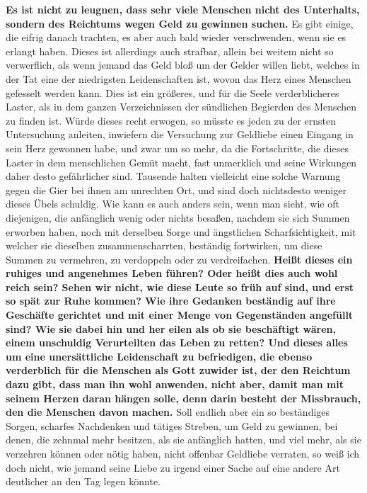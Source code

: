 \medskip

\textbf{Es ist nicht zu leugnen, dass sehr viele Menschen nicht des Unterhalts,
sondern
des Reichtums wegen Geld zu gewinnen suchen.} Es gibt einige, die eifrig
danach trachten, es aber auch bald wieder verschwenden,
wenn sie es erlangt
haben. Dieses ist allerdings auch strafbar, allein bei weitem nicht so
verwerflich, als wenn jemand das Geld bloß um der Gelder willen liebt, welches
in der Tat eine der niedrigsten Leidenschaften
ist, wovon das Herz eines
Menschen gefesselt werden kann. Dies ist ein größeres, und für die Seele
verderblicheres Laster, als in dem ganzen Verzeichnissen der sündlichen
Begierden des Menschen zu finden ist. Würde dieses recht erwogen, so müsste es
jeden zu der ernsten Untersuchung anleiten, inwiefern die Versuchung zur
Geldliebe einen Eingang in sein Herz gewonnen habe, und zwar um so mehr, da die
Fortschritte, die dieses Laster in dem menschlichen Gemüt macht, fast
unmerklich und seine Wirkungen daher desto gefährlicher sind. Tausende halten
vielleicht eine solche Warnung gegen die Gier bei ihnen am unrechten Ort, und
sind doch nichtsdesto weniger dieses Übels schuldig. Wie kann es auch anders
sein, wenn man sieht, wie oft diejenigen, die anfänglich wenig oder nichts
besaßen, nachdem sie sich Summen erworben haben, noch mit derselben Sorge und
ängstlichen Scharfsichtigkeit, mit welcher sie dieselben zusammenscharrten,
beständig fortwirken, um diese Summen zu vermehren, zu verdoppeln oder zu
verdreifachen. \textbf{Heißt dieses ein ruhiges und angenehmes Leben führen?
Oder heißt
dies auch wohl reich sein? Sehen wir nicht, wie diese Leute so früh auf sind,
und erst so spät zur Ruhe kommen? Wie ihre Gedanken beständig auf ihre Geschäfte
gerichtet und mit einer Menge von Gegenständen angefüllt sind? Wie sie dabei hin
und her eilen als ob sie beschäftigt wären, einem unschuldig Verurteilten das
Leben zu retten? Und dieses alles um eine unersättliche Leidenschaft zu
befriedigen, die ebenso verderblich für die Menschen als Gott zuwider ist, der
den Reichtum dazu gibt, dass man ihn wohl anwenden, nicht aber, damit man mit
seinem Herzen daran hängen solle, denn darin besteht der Missbrauch, den die
Menschen davon machen.} Soll endlich aber ein so beständiges Sorgen, scharfes
Nachdenken und tätiges Streben, um Geld zu gewinnen, bei denen, die zehnmal
mehr besitzen, als sie anfänglich hatten, und viel mehr, als sie verzehren
können oder nötig haben, nicht offenbar Geldliebe verraten, so weiß ich doch
nicht, wie jemand seine Liebe zu irgend einer Sache auf eine andere Art
deutlicher an den Tag legen könnte.

